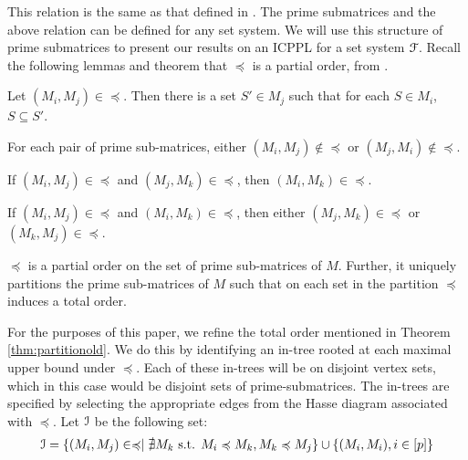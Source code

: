 \documentclass[a4paper,UKenglish,numberwithinsect]{lipics}
\def\cF{{\cal F}}
\def\cI{{\cal I}}
\begin{document}
\noindent
This relation is the same as that defined in \cite{nsnrs09}. The prime
submatrices and the above relation can be defined for any set
system. We will use this structure of prime submatrices to present our
results on an ICPPL for a set system $\cF$. Recall the following
lemmas and theorem that $\preccurlyeq$ is a partial order, from
\cite{nsnrs09}.

\begin{lemma} \label{lem:containment}
Let $(M_i,M_j) \in \preccurlyeq$.  Then there is a set $S' \in M_j$ such that for each $S \in M_i$, $S \subseteq S'$. 
\end{lemma}
\vspace{-3mm}
\begin{lemma}
For each pair of prime sub-matrices, either $(M_i,M_j) \not\in \preccurlyeq$ or $(M_j,M_i) \not\in \preccurlyeq$.
\end{lemma}
\vspace{-3mm}
\begin{lemma}
If $(M_i,M_j) \in \preccurlyeq $ and $(M_j,M_k) \in \preccurlyeq$, then $(M_i,M_k) \in \preccurlyeq$.
\end{lemma}
\vspace{-3mm}
\begin{lemma} \label{lem:twoparents}
If $(M_i,M_j) \in \preccurlyeq$ and $(M_i,M_k) \in \preccurlyeq$, then
either $(M_j,M_k) \in \preccurlyeq$ or $(M_k,M_j) \in \preccurlyeq$. 
\end{lemma}
\vspace{-3mm}
\begin{theorem} \label{thm:partitionold}
  $\preccurlyeq$ is a partial order on the set of prime sub-matrices
  of $M$.  Further, it uniquely partitions the prime sub-matrices of
  $M$ such that on each set in the partition $\preccurlyeq$ induces a
  total order.
\end{theorem}
\noindent
For the purposes of this paper, we refine the total order mentioned in
Theorem \ref{thm:partitionold}. We do this by identifying an in-tree
rooted at each maximal upper bound under $\preccurlyeq$.  Each of
these in-trees will be on disjoint vertex sets, which in this case
would be disjoint sets of prime-submatrices.  The in-trees are
specified by selecting the appropriate edges from the Hasse diagram
associated with $\preccurlyeq$.  Let $\cI$ be the following set:
\vspace{-3mm}
\begin{align*}
  \cI = \{ (M_i,M_j) \space \in \space \preccurlyeq \mid \nexists M_k \text{ s.t. } M_i \preccurlyeq M_k, M_k \preccurlyeq M_j
  \} \cup \{ (M_i,M_i), i \in [p] \}
\end{align*}
\end{document}
